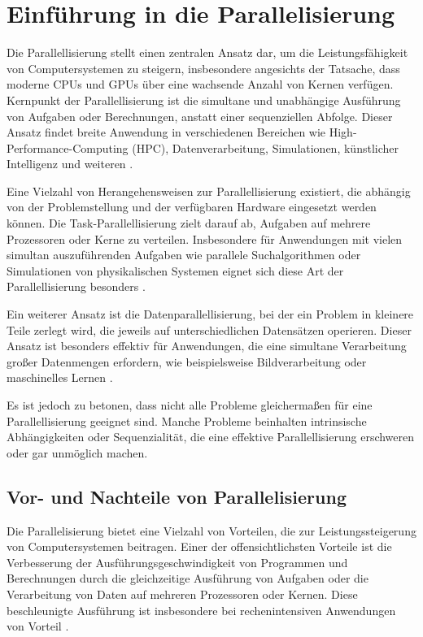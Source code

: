 \section{Einführung in die Parallelisierung}
\label{sec:Grundlagen_Parallelisierung}
Die Parallellisierung stellt einen zentralen Ansatz dar, um die Leistungsfähigkeit von Computersystemen zu steigern, insbesondere angesichts der Tatsache, dass moderne CPUs und GPUs über eine wachsende Anzahl von Kernen verfügen. Kernpunkt der Parallellisierung ist die simultane und unabhängige Ausführung von Aufgaben oder Berechnungen, anstatt einer sequenziellen Abfolge. Dieser Ansatz findet breite Anwendung in verschiedenen Bereichen wie High-Performance-Computing (HPC), Datenverarbeitung, Simulationen, künstlicher Intelligenz und weiteren \citep{Flynn_Computer_Organizations_and_their_Effectiveness}.

Eine Vielzahl von Herangehensweisen zur Parallellisierung existiert, die abhängig von der Problemstellung und der verfügbaren Hardware eingesetzt werden können. Die Task-Parallellisierung zielt darauf ab, Aufgaben auf mehrere Prozessoren oder Kerne zu verteilen. Insbesondere für Anwendungen mit vielen simultan auszuführenden Aufgaben wie parallele Suchalgorithmen oder Simulationen von physikalischen Systemen eignet sich diese Art der Parallellisierung besonders \citep{Flynn_Computer_Organizations_and_their_Effectiveness}.

Ein weiterer Ansatz ist die Datenparallellisierung, bei der ein Problem in kleinere Teile zerlegt wird, die jeweils auf unterschiedlichen Datensätzen operieren. Dieser Ansatz ist besonders effektiv für Anwendungen, die eine simultane Verarbeitung großer Datenmengen erfordern, wie beispielsweise Bildverarbeitung oder maschinelles Lernen \citep{Flynn_Computer_Organizations_and_their_Effectiveness}.

Es ist jedoch zu betonen, dass nicht alle Probleme gleichermaßen für eine Parallellisierung geeignet sind. Manche Probleme beinhalten intrinsische Abhängigkeiten oder Sequenzialität, die eine effektive Parallellisierung erschweren oder gar unmöglich machen.

\subsection{Vor- und Nachteile von Parallelisierung}
\label{sec:Grundlagen_Parallelisierung_Vorteile_Nachteile}
Die Parallelisierung bietet eine Vielzahl von Vorteilen, die zur Leistungssteigerung von Computersystemen beitragen. Einer der offensichtlichsten Vorteile ist die Verbesserung der Ausführungsgeschwindigkeit von Programmen und Berechnungen durch die gleichzeitige Ausführung von Aufgaben oder die Verarbeitung von Daten auf mehreren Prozessoren oder Kernen. Diese beschleunigte Ausführung ist insbesondere bei rechenintensiven Anwendungen von Vorteil \citep{Flynn_Computer_Organizations_and_their_Effectiveness}.

